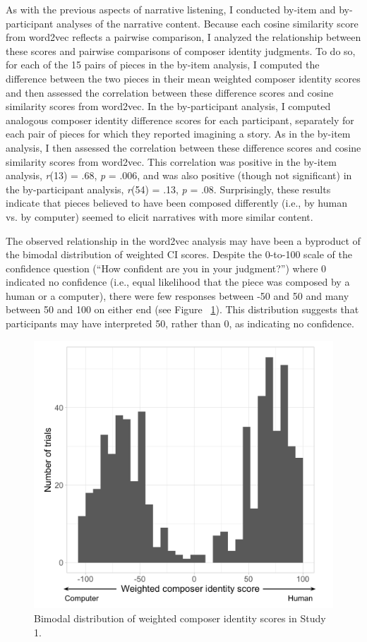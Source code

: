 \documentclass[12pt,twoside]{reedthesis}
\begin{document}
As with the previous aspects of narrative listening, I conducted by-item and by-participant analyses of the narrative content. Because each cosine similarity score from word2vec reflects a pairwise comparison, I analyzed the relationship between these scores and pairwise comparisons of composer identity judgments. To do so, for each of the 15 pairs of pieces in the by-item analysis, I computed the difference between the two pieces in their mean weighted composer identity scores and then assessed the correlation between these difference scores and cosine similarity scores from word2vec. In the by-participant analysis, I computed analogous composer identity difference scores for each participant, separately for each pair of pieces for which they reported imagining a story. As in the by-item analysis, I then assessed the correlation between these difference scores and cosine similarity scores from word2vec. This correlation was positive in the by-item analysis, \emph{r}(13) = .68, \emph{p} = .006, and was also positive (though not significant) in the by-participant analysis, \emph{r}(54) = .13, \emph{p} = .08. Surprisingly, these results indicate that pieces believed to have been composed differently (i.e., by human vs. by computer) seemed to elicit narratives with more similar content. 

The observed relationship in the word2vec analysis may have been a byproduct of the bimodal distribution of weighted CI scores. Despite the 0-to-100 scale of  the confidence question (“How confident are you in your judgment?”) where 0 indicated no confidence (i.e., equal likelihood that the piece was composed by a human or a computer), there were few responses between -50 and 50 and many between 50 and 100 on either end (see Figure ~\ref*{fig-bimodal-dist}). This distribution suggests that participants may have interpreted 50, rather than 0, as indicating no confidence. 

\begin{figure}[h!tbp]
	\centering
	\includegraphics[scale=0.5]{weighted_dist.png}
	\caption{Bimodal distribution of weighted composer identity scores in Study 1.}
	\label{fig-bimodal-dist}
\end{figure}
\end{document}
